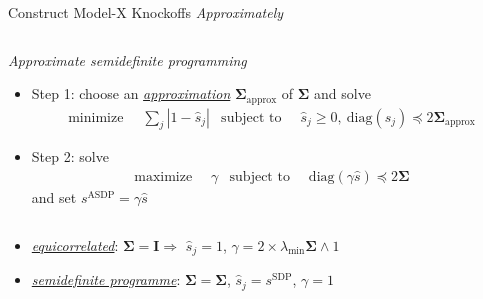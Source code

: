    \begin{frame}{Construct Model-X Knockoffs \textit{Approximately}}
       
        \begin{columns}
            \begin{column}{0.95\textwidth}
                {\scriptsize
                \begin{block}{\small \textit{Approximate semidefinite programming}}
                    {\begin{itemize}
                        \item Step 1: choose an \textcolor{glaucous!65!white}{\underline{\textit{approximation}}} $\boldsymbol{\Sigma}_{\mathrm{approx}}$ of $\boldsymbol{\Sigma}$  and solve
                        \begin{align*}
                            \text{minimize }\ & \sum_j\left\vert 1-\hat{s}_j \right\vert & \text{subject to }\ & \hat{s}_j\geq 0, \ \mathrm{diag}\left(\hat{s}_j\right)\preceq 2\boldsymbol{\Sigma}_{\mathrm{approx}}
                        \end{align*}
                        \item Step 2: solve 
                        \begin{align*}
                            \text{maximize }\ & \gamma & \text{subject to }\ & \mathrm{diag}\left(\gamma \hat{s}\right)\preceq 2\boldsymbol{\Sigma}
                        \end{align*}
                        and set $s^{\mathrm{ASDP}}=\gamma \hat{s}$
                    \end{itemize}}
                \end{block}}
            \end{column}
        \end{columns}

        \vspace*{5pt}
        \begin{itemize}
            \small
            \item<2->[-] \textcolor{glaucous!65!white}{\underline{\textit{equicorrelated}}}: $\boldsymbol{\Sigma}=\mathbf{I}\Rightarrow$ $\hat{s}_j =1$, $\gamma = 2\times \lambda_{\min}\boldsymbol{\Sigma}\wedge 1$
            \item<3->[-] \textcolor{glaucous!65!white}{\underline{\textit{semidefinite programme}}}: $\boldsymbol{\Sigma}=\boldsymbol{\Sigma}$, $\hat{s}_j = s^{\mathrm{SDP}}$, $\gamma=1$
        \end{itemize}

    \end{frame}
